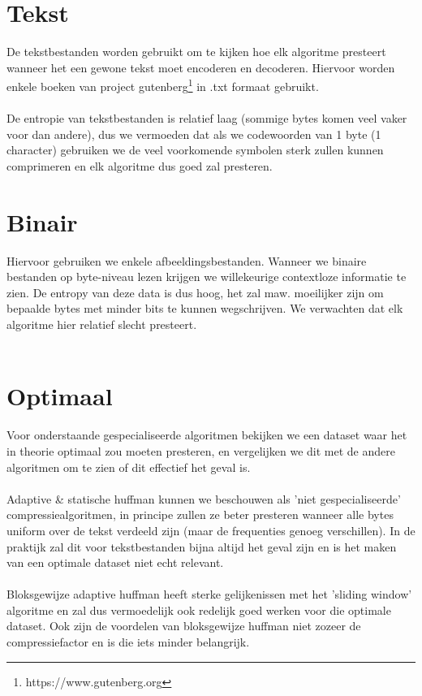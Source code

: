 \documentclass[a4paper,12pt]{report}
\begin{document}
\section{Tekst}
De tekstbestanden worden gebruikt om te kijken hoe elk algoritme presteert wanneer het een gewone tekst moet encoderen en decoderen. Hiervoor worden enkele boeken van project gutenberg\footnote{https://www.gutenberg.org} in .txt formaat gebruikt. \\ \\
De entropie van tekstbestanden is relatief laag (sommige bytes komen veel vaker voor dan andere), dus we vermoeden dat als we codewoorden van 1 byte (1 character) gebruiken we de veel voorkomende symbolen sterk zullen kunnen comprimeren en elk algoritme dus goed zal presteren.
\section{Binair}
Hiervoor gebruiken we enkele afbeeldingsbestanden. Wanneer we binaire bestanden op byte-niveau lezen krijgen we willekeurige contextloze informatie te zien. De entropy van deze data is dus hoog, het zal maw. moeilijker zijn om bepaalde bytes met minder bits te kunnen wegschrijven. We verwachten dat elk algoritme hier relatief slecht presteert. \\ \\
\section{Optimaal}
Voor onderstaande gespecialiseerde algoritmen bekijken we een dataset waar het in theorie optimaal zou moeten presteren, en vergelijken we dit met de andere algoritmen om te zien of dit effectief het geval is. \\ \\
Adaptive \& statische huffman kunnen we beschouwen als 'niet gespecialiseerde' compressiealgoritmen, in principe zullen ze beter presteren wanneer alle bytes uniform over de tekst verdeeld zijn (maar de frequenties genoeg verschillen). In de praktijk zal dit voor tekstbestanden bijna altijd het geval zijn en is het maken van een optimale dataset niet echt relevant. \\ \\
Bloksgewijze adaptive huffman heeft sterke gelijkenissen met het 'sliding window' algoritme en zal dus vermoedelijk ook redelijk goed werken voor die optimale dataset. Ook zijn de voordelen van bloksgewijze huffman niet zozeer de compressiefactor en is die iets minder belangrijk.
\end{document}
